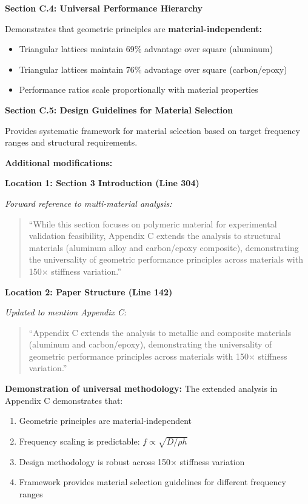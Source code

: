 \documentclass[11pt,a4paper]{article}
\newenvironment{changesbox}{%
    \par\medskip\noindent{\color{changescolor}\rule{\linewidth}{2pt}}\par
    \noindent{\color{changescolor}\bfseries Manuscript Changes}\par\smallskip
}{%
    \par\noindent{\color{changescolor}\rule{\linewidth}{0.5pt}}\medskip
}
\begin{document}
\begin{changesbox}
\textbf{Section C.4: Universal Performance Hierarchy}

Demonstrates that geometric principles are \textbf{material-independent:}
\begin{itemize}
    \item Triangular lattices maintain 69\% advantage over square (aluminum)
    \item Triangular lattices maintain 76\% advantage over square (carbon/epoxy)
    \item Performance ratios scale proportionally with material properties
\end{itemize}

\textbf{Section C.5: Design Guidelines for Material Selection}

Provides systematic framework for material selection based on target frequency ranges and structural requirements.

\textbf{Additional modifications:}

\textbf{Location 1: Section 3 Introduction (Line 304)}

\textit{Forward reference to multi-material analysis:}
\begin{quote}
\textcolor{redtext}{``While this section focuses on polymeric material for experimental validation feasibility, Appendix C extends the analysis to structural materials (aluminum alloy and carbon/epoxy composite), demonstrating the universality of geometric performance principles across materials with 150$\times$ stiffness variation.''}
\end{quote}

\textbf{Location 2: Paper Structure (Line 142)}

\textit{Updated to mention Appendix C:}
\begin{quote}
\textcolor{redtext}{``Appendix C extends the analysis to metallic and composite materials (aluminum and carbon/epoxy), demonstrating the universality of geometric performance principles across materials with 150$\times$ stiffness variation.''}
\end{quote}
\end{changesbox}

\textbf{Demonstration of universal methodology:} The extended analysis in Appendix C demonstrates that:
\begin{enumerate}
    \item Geometric principles are material-independent
    \item Frequency scaling is predictable: $f \propto \sqrt{D/\rho h}$
    \item Design methodology is robust across 150$\times$ stiffness variation
    \item Framework provides material selection guidelines for different frequency ranges
\end{enumerate}
\end{document}
